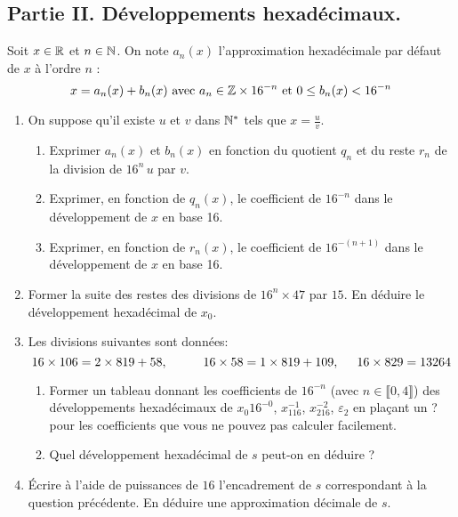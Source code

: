 \subsection*{Partie II. Développements hexadécimaux.}
Soit $x\in \mathbb{R}$ et $n\in \mathbb{N}$. On note $a_n(x)$ l'approximation hexadécimale par défaut de $x$ à l'ordre $n$ :
\begin{displaymath}
 x = a_n(x) + b_n(x) \text{ avec } a_n \in \mathbb{Z}\times 16^{-n} \text{ et } 0\leq b_n(x) < 16^{-n}
\end{displaymath}
\begin{enumerate}
 \item 
On suppose qu'il existe $u$ et $v$ dans $\mathbb{N}^*$ tels que $x=\frac{u}{v}$.
\begin{enumerate}
 \item Exprimer $a_n(x)$ et $b_n(x)$ en fonction du quotient $q_n$ et du reste $r_n$ de la division de $16^n\,u$ par $v$.
 \item Exprimer, en fonction de $q_n(x)$, le coefficient de $16^{-n}$ dans le développement de $x$ en base 16.
 \item Exprimer, en fonction de $r_n(x)$, le coefficient de $16^{-(n+1)}$ dans le développement de $x$ en base 16.
\end{enumerate}

 \item Former la suite des restes des divisions de $16^n\times 47$ par $15$. En déduire le développement hexadécimal de $x_0$.
 
 \item Les divisions suivantes sont données:
\begin{displaymath}
 16 \times 106 = 2\times 819 + 58, \hspace{1cm} 16 \times 58 = 1\times 819 + 109, \hspace{0.5cm} 16\times 829 = 13264
\end{displaymath}
\begin{enumerate}
 \item Former un tableau donnant les coefficients de $16^{-n}$ (avec $n\in \llbracket 0, 4\rrbracket$) des développements hexadécimaux de $x_0 16^{-0}$, $x_116^{-1}$, $x_216^{-2}$, $\varepsilon_2$ en plaçant un \og ?\fg~ pour les coefficients que vous ne pouvez pas calculer facilement.
 \item Quel développement hexadécimal de $s$ peut-on en déduire ?
\end{enumerate}
 \item \'Ecrire à l'aide de puissances de $16$ l'encadrement de $s$ correspondant à la question précédente. En déduire une approximation décimale de $s$.
\end{enumerate}


